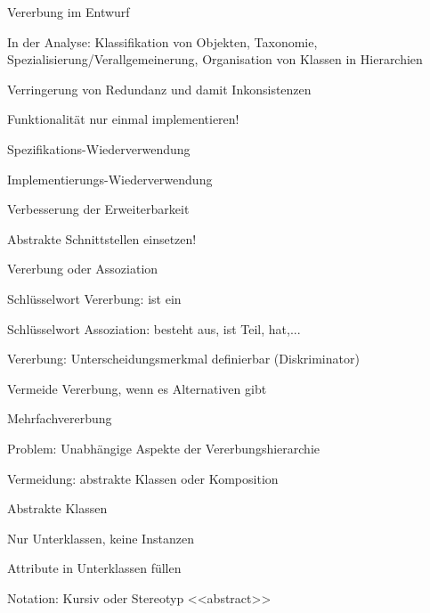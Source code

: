 \documentclass[a4paper]{article}
\begin{document}
\begin{multicols}{3}
  Vererbung im Entwurf
  \begin{itemize*}
    \item In der Analyse: Klassifikation von Objekten, Taxonomie, Spezialisierung/Verallgemeinerung, Organisation von Klassen in Hierarchien
    \item Verringerung von Redundanz und damit Inkonsistenzen
    \begin{itemize*}
      \item Funktionalität nur einmal implementieren!
      \item Spezifikations-Wiederverwendung
      \item Implementierungs-Wiederverwendung
    \end{itemize*}
    \item Verbesserung der Erweiterbarkeit
    \begin{itemize*}
      \item Abstrakte Schnittstellen einsetzen!
    \end{itemize*}
  \end{itemize*}

  Vererbung oder Assoziation
  \begin{itemize*}
    \item Schlüsselwort Vererbung: ist ein
    \item Schlüsselwort Assoziation: besteht aus, ist Teil, hat,...
    \item Vererbung: Unterscheidungsmerkmal definierbar (Diskriminator)
    \item Vermeide Vererbung, wenn es Alternativen gibt
    \item Mehrfachvererbung
    \begin{itemize*}
      \item Problem: Unabhängige Aspekte der Vererbungshierarchie
      \item Vermeidung: abstrakte Klassen oder Komposition
    \end{itemize*}
  \end{itemize*}

  Abstrakte Klassen
  \begin{itemize*}
    \item Nur Unterklassen, keine Instanzen
    \item Attribute in Unterklassen füllen
    \item Notation: Kursiv oder Stereotyp <<abstract>>
  \end{itemize*}


\end{multicols}
\end{document}
